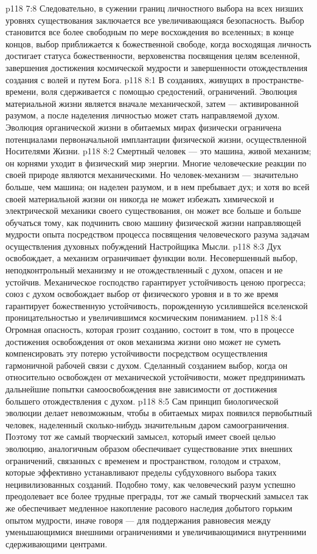 \vs p118 7:8 Следовательно, в сужении границ личностного выбора на всех низших уровнях существования заключается все увеличивающаяся безопасность. Выбор становится все более свободным по мере восхождения во вселенных; в конце концов, выбор приближается к божественной свободе, когда восходящая личность достигает статуса божественности, верховенства посвящения целям вселенной, завершения достижения космической мудрости и завершенности отождествления создания с волей и путем Бога.
\vs p118 8:1 В созданиях, живущих в пространстве\hyp{}времени, воля сдерживается с помощью средостений, ограничений. Эволюция материальной жизни является вначале механической, затем --- активированной разумом, а после наделения личностью может стать направляемой духом. Эволюция органической жизни в обитаемых мирах физически ограничена потенциалами первоначальной имплантации физической жизни, осуществленной Носителями Жизни.
\vs p118 8:2 Смертный человек --- это машина, живой механизм; он корнями уходит в физический мир энергии. Многие человеческие реакции по своей природе являются механическими. Но человек\hyp{}механизм --- значительно больше, чем машина; он наделен разумом, и в нем пребывает дух; и хотя во всей своей материальной жизни он никогда не может избежать химической и электрической механики своего существования, он может все больше и больше обучаться тому, как подчинить свою машину физической жизни направляющей мудрости опыта посредством процесса посвящения человеческого разума задачам осуществления духовных побуждений Настройщика Мысли.
\vs p118 8:3 \pc Дух освобождает, а механизм ограничивает функции воли. Несовершенный выбор, неподконтрольный механизму и не отождествленный с духом, опасен и не устойчив. Механическое господство гарантирует устойчивость ценою прогресса; союз с духом освобождает выбор от физического уровня и в то же время гарантирует божественную устойчивость, порожденную усилившейся вселенской проницательностью и увеличившимся космическим пониманием.
\vs p118 8:4 Огромная опасность, которая грозит созданию, состоит в том, что в процессе достижения освобождения от оков механизма жизни оно может не суметь компенсировать эту потерю устойчивости посредством осуществления гармоничной рабочей связи с духом. Сделанный созданием выбор, когда он относительно освобожден от механической устойчивости, может предпринимать дальнейшие попытки самоосвобождения вне зависимости от достижения большего отождествления с духом.
\vs p118 8:5 Сам принцип биологической эволюции делает невозможным, чтобы в обитаемых мирах появился первобытный человек, наделенный сколько\hyp{}нибудь значительным даром самоограничения. Поэтому тот же самый творческий замысел, который имеет своей целью эволюцию, аналогичным образом обеспечивает существование этих внешних ограничений, связанных с временем и пространством, голодом и страхом, которые эффективно устанавливают пределы субдуховного выбора таких нецивилизованных созданий. Подобно тому, как человеческий разум успешно преодолевает все более трудные преграды, тот же самый творческий замысел так же обеспечивает медленное накопление расового наследия добытого горьким опытом мудрости, иначе говоря --- для поддержания равновесия между уменьшающимися внешними ограничениями и увеличивающимися внутренними сдерживающими центрами.
